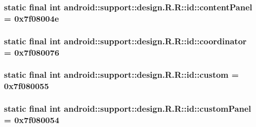 \hypertarget{classandroid_1_1support_1_1design_1_1_r_1_1id_7f6c563ffab3644877364cac8a1d3b64}{
\subsubsection[{contentPanel}]{\setlength{\rightskip}{0pt plus 5cm}static final int android::support::design.R.R::id::contentPanel = 0x7f08004e}}
\label{classandroid_1_1support_1_1design_1_1_r_1_1id_7f6c563ffab3644877364cac8a1d3b64}


\hypertarget{classandroid_1_1support_1_1design_1_1_r_1_1id_244773bc326a6a1871e2c16babdae129}{
\subsubsection[{coordinator}]{\setlength{\rightskip}{0pt plus 5cm}static final int android::support::design.R.R::id::coordinator = 0x7f080076}}
\label{classandroid_1_1support_1_1design_1_1_r_1_1id_244773bc326a6a1871e2c16babdae129}


\hypertarget{classandroid_1_1support_1_1design_1_1_r_1_1id_958e969fbb4d9febe3366836fe639434}{
\subsubsection[{custom}]{\setlength{\rightskip}{0pt plus 5cm}static final int android::support::design.R.R::id::custom = 0x7f080055}}
\label{classandroid_1_1support_1_1design_1_1_r_1_1id_958e969fbb4d9febe3366836fe639434}


\hypertarget{classandroid_1_1support_1_1design_1_1_r_1_1id_01f7d1a8d8b1ed8117598fb43b7fdba6}{
\subsubsection[{customPanel}]{\setlength{\rightskip}{0pt plus 5cm}static final int android::support::design.R.R::id::customPanel = 0x7f080054}}
\label{classandroid_1_1support_1_1design_1_1_r_1_1id_01f7d1a8d8b1ed8117598fb43b7fdba6}


